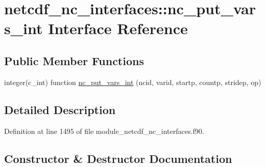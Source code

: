 \hypertarget{interfacenetcdf__nc__interfaces_1_1nc__put__vars__int}{}\section{netcdf\+\_\+nc\+\_\+interfaces\+:\+:nc\+\_\+put\+\_\+vars\+\_\+int Interface Reference}
\label{interfacenetcdf__nc__interfaces_1_1nc__put__vars__int}
\subsection*{Public Member Functions}
\begin{DoxyCompactItemize}
\item 
integer(c\+\_\+int) function \hyperlink{interfacenetcdf__nc__interfaces_1_1nc__put__vars__int_ab3240afbc4d14b11bd279f0f59f35142}{nc\+\_\+put\+\_\+vars\+\_\+int} (ncid, varid, startp, countp, stridep, op)
\end{DoxyCompactItemize}


\subsection{Detailed Description}


Definition at line 1495 of file module\+\_\+netcdf\+\_\+nc\+\_\+interfaces.\+f90.



\subsection{Constructor \& Destructor Documentation}
\mbox{\label{interfacenetcdf__nc__interfaces_1_1nc__put__vars__int_ab3240afbc4d14b11bd279f0f59f35142}} 
